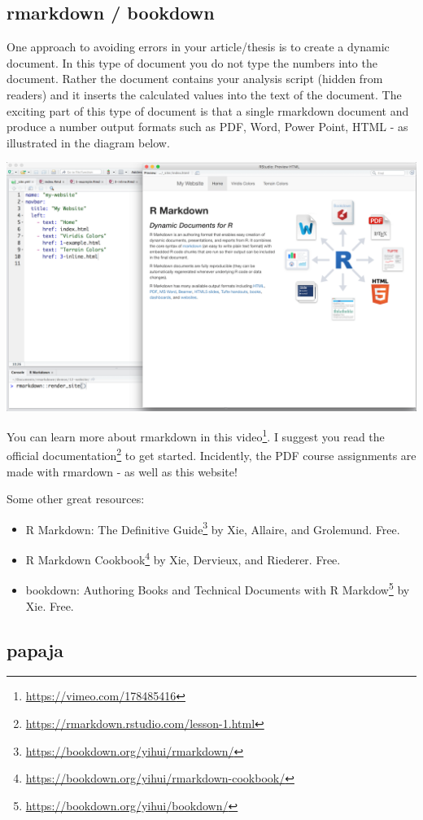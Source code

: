 \documentclass[
]{krantz}
\renewcommand{\href}[2]{#2\footnote{\url{#1}}}
\begin{document}
\hypertarget{rmarkdown-bookdown}{%
\subsection{rmarkdown / bookdown}\label{rmarkdown-bookdown}}

One approach to avoiding errors in your article/thesis is to create a dynamic document. In this type of document you do not type the numbers into the document. Rather the document contains your analysis script (hidden from readers) and it inserts the calculated values into the text of the document. The exciting part of this type of document is that a single rmarkdown document and produce a number output formats such as PDF, Word, Power Point, HTML - as illustrated in the diagram below.

\includegraphics[width=0.6\linewidth]{ch_tools/images/rmarkdown_docs}

You can learn more about rmarkdown in this \href{https://vimeo.com/178485416}{video}. I suggest you read the official \href{https://rmarkdown.rstudio.com/lesson-1.html}{documentation} to get started. Incidently, the PDF course assignments are made with rmardown - as well as this website!

Some other great resources:

\begin{itemize}
\item
  \href{https://bookdown.org/yihui/rmarkdown/}{R Markdown: The Definitive Guide} by Xie, Allaire, and Grolemund. Free.
\item
  \href{https://bookdown.org/yihui/rmarkdown-cookbook/}{R Markdown Cookbook} by Xie, Dervieux, and Riederer. Free.
\item
  \href{https://bookdown.org/yihui/bookdown/}{bookdown: Authoring Books and Technical Documents with R Markdow} by Xie. Free.
\end{itemize}

\hypertarget{papaja}{%
\subsection{papaja}\label{papaja}}
\end{document}
